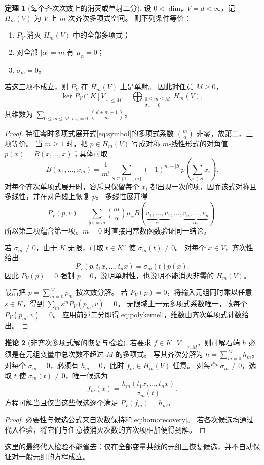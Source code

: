 \documentclass[UTF8,11pt,a4paper]{ctexart}
\theoremstyle{definition}
\newtheorem{theorem}{定理}[section]
\newtheorem{corollary}[theorem]{推论}
\numberwithin{equation}{section}
\begin{document}
\begin{theorem}[每个齐次次数上的消灭或单射二分]\label{thm:moment}
设 $0<\dim_KV=d<\infty$，记 $H_m(V)$ 为 $V$ 上 $m$ 次齐次多项式空间。
则下列条件等价：
\begin{enumerate}
\item $P_V$ 消灭 $H_m(V)$ 中的全部多项式；
\item 对全部 $|\alpha|=m$ 有 $\mu_\alpha=0$；
\item $\sigma_m=0$。
\end{enumerate}
若这三项不成立，则 $P_V$ 在 $H_m(V)$ 上是单射。
因此对任意 $M\ge0$，
\begin{equation}\label{eq:polykernel}
 \ker P_V\cap K[V]_{\le M}
 =\bigoplus_{\substack{0\le m\le M\\\sigma_m=0}}H_m(V),
\end{equation}
其维数为 $\sum_{0\le m\le M,\ \sigma_m=0}\binom{d+m-1}{m}$。
\end{theorem}
\begin{proof}
特征零时多项式展开式\eqref{eq:symbol}的多项式系数 $\binom m\alpha$ 非零，故第二、三项等价。
当 $m\ge1$ 时，把 $p\in H_m(V)$ 写成对称 $m$-线性形式的对角值 $p(x)=B(x,\ldots,x)$；具体可取
\[
 B(x_1,\ldots,x_m)=\frac1{m!}\sum_{S\subseteq\{1,\ldots,m\}}
 (-1)^{m-|S|}p\left(\sum_{i\in S}x_i\right).
\]
对每个齐次单项式展开时，容斥只保留每个 $x_i$ 都出现一次的项，因而该式对称且多线性，并在对角线上恢复 $p$。
多线性展开得
\[
 P_V(p,v)=\sum_{|\alpha|=m}\binom m\alpha\mu_\alpha
 B(\underbrace{v_1,\ldots,v_1}_{\alpha_1},\ldots,
   \underbrace{v_n,\ldots,v_n}_{\alpha_n}).
\]
所以第二项蕴含第一项。$m=0$ 时直接用常数函数验证同一结论。

若 $\sigma_m\ne0$，由于 $K$ 无限，可取 $t\in K^n$ 使 $\sigma_m(t)\ne0$。
对每个 $x\in V$，齐次性给出
\begin{equation}\label{eq:homorecovery}
 P_V(p,t_1x,\ldots,t_nx)=\sigma_m(t)p(x).
\end{equation}
因此 $P_V(p)=0$ 强制 $p=0$，说明单射性，也说明不能消灭非零的 $H_m(V)$。

最后把 $p=\sum_{m=0}^M p_m$ 按次数分解。
若 $P_V(p)=0$，将输入元组同时乘以任意 $s\in K$，得到
$\sum_m s^mP_V(p_m,v)=0$。
无限域上一元多项式系数唯一，故每个 $P_V(p_m,v)=0$。
应用前述二分即得\eqref{eq:polykernel}，维数由齐次单项式计数给出。
\end{proof}

\begin{corollary}[非齐次多项式解的恢复与检验]\label{cor:polyrecover}
若要求 $f\in K[V]_{\le M}$，则可解右端 $h$ 必须是在元组变量中总次数不超过 $M$ 的多项式。
写其齐次分解为 $h=\sum_{m=0}^M h_m$。
对每个 $\sigma_m=0$，必须有 $h_m=0$，此时 $f_m\in H_m(V)$ 任意。
对每个 $\sigma_m\ne0$，选取 $t$ 使 $\sigma_m(t)\ne0$，唯一候选为
\[
 f_m(x)=\frac{h_m(t_1x,\ldots,t_nx)}{\sigma_m(t)}.
\]
方程可解当且仅当这些候选逐个满足 $P_V(f_m)=h_m$。
\end{corollary}
\begin{proof}
必要性与候选公式来自次数保持和\eqref{eq:homorecovery}。
若各次候选均通过代入检验，将它们与任意被消灭次数的齐次项相加便得到解。
\end{proof}
这里的最终代入检验不能省去：仅在全部变量共线的元组上恢复候选，并不自动保证对一般元组的方程成立。
\end{document}
